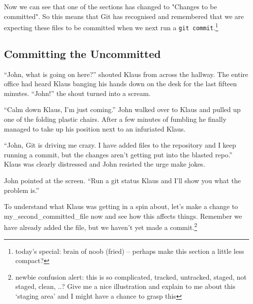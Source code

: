 
Now we can see that one of the sections has changed to "Changes to be committed".
So this means that Git has recognised and remembered that we are expecting these files to be committed when we next run a \texttt{git commit}.\footnote{today's special: brain of noob (fried) -- perhaps make this section a little less compact?}

\subsection{Committing the Uncommitted}

\begin{trenches}
``John, what is going on here?'' shouted Klaus from across the hallway.
The entire office had heard Klaus banging his hands down on the desk for the last fifteen minutes.
``John!'' the shout turned into a scream.

``Calm down Klaus, I'm just coming.''
John walked over to Klaus and pulled up one of the folding plastic chairs.
After a few minutes of fumbling he finally managed to take up his position next to an infuriated Klaus.

``John, Git is driving me crazy. I have added files to the repository and I keep running a commit, but the changes aren't getting put into the blasted repo.''
Klaus was clearly distressed and John resisted the urge make jokes.

John pointed at the screen.
``Run a git status Klaus and I'll show you what the problem is.''
\end{trenches}

To understand what Klaus was getting in a spin about, let's make a change to my\_second\_committed\_file now and see how this affects things.
Remember we have already added the file, but we haven't yet made a commit.\footnote{newbie confusion alert: this is so complicated, tracked, untracked, staged, not staged, clean, ..? Give me a nice illustration and explain to me about this `staging area' and I might have a chance to grasp this}

